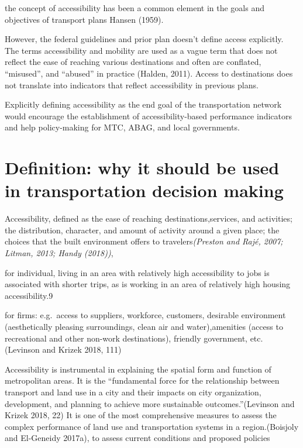 \documentclass[12pt,]{article}
\begin{document}
the concept of accessibility has been a common element in the goals and
objectives of transport plans Hansen (1959).

However, the federal guidelines and prior plan doesn't define access
explicitly. The terms accessibility and mobility are used as a vague
term that does not reflect the ease of reaching various destinations and
often are conflated, ``misused'', and ``abused'' in practice (Halden,
2011). Access to destinations does not translate into indicators that
reflect accessibility in previous plans.

Explicitly defining accessibility as the end goal of the transportation
network would encourage the establishment of accessibility-based
performance indicators and help policy-making for MTC, ABAG, and local
governments.

\hypertarget{definition-why-it-should-be-used-in-transportation-decision-making}{%
\section{Definition: why it should be used in transportation decision
making}\label{definition-why-it-should-be-used-in-transportation-decision-making}}

Accessibility, defined as the ease of reaching destinations,services,
and activities; the distribution, character, and amount of activity
around a given place; the choices that the built environment offers to
travelers\emph{(Preston and Rajé, 2007; Litman, 2013; Handy (2018))},

for individual, living in an area with relatively high accessibility to
jobs is associated with shorter trips, as is working in an area of
relatively high housing accessibility.9

for firms: e.g.~access to suppliers, workforce, customers, desirable
environment (aesthetically pleasing surroundings, clean air and
water),amenities (access to recreational and other non-work
destinations), friendly government, etc. (Levinson and Krizek 2018, 111)

Accessibility is instrumental in explaining the spatial form and
function of metropolitan areas. It is the ``fundamental force for the
relationship between transport and land use in a city and their impacts
on city organization, development, and planning to achieve more
sustainable outcomes.''(Levinson and Krizek 2018, 22) It is one of the
most comprehensive measures to assess the complex performance of land
use and transportation systems in a region.(Boisjoly and El-Geneidy
2017a), to assess current conditions and proposed policies
\end{document}
